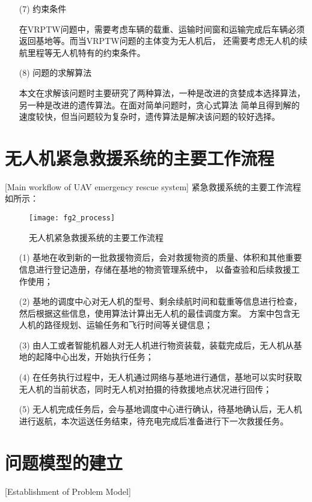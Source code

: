 \begin{itemize}
	\item[(7)]
	约束条件
	

	\qquad 在VRPTW问题中，需要考虑车辆的载重、运输时间窗和运输完成后车辆必须返回基地等。而当VRPTW问题的主体变为无人机后，
	还需要考虑无人机的续航里程等无人机特有的约束条件。

	\item[(8)]
	问题的求解算法


	\qquad 本文在求解该问题时主要研究了两种算法，一种是改进的贪婪成本选择算法，另一种是改进的遗传算法。在面对简单问题时，贪心式算法
	简单且得到解的速度较快，但当问题较为复杂时，遗传算法是解决该问题的较好选择。
\end{itemize}

\section{无人机紧急救援系统的主要工作流程}[Main workflow of UAV emergency rescue system]
紧急救援系统的主要工作流程如所示：

\begin{figure}[ht]
	\centering
	\texttt{[image: fg2\_process]}
	\caption{无人机紧急救援系统的主要工作流程}
	\label{fg202}
\end{figure}

\begin{itemize}
	\item [(1)]基地在收到新的一批救援物资后，会对救援物资的质量、体积和其他重要信息进行登记造册，存储在基地的物资管理系统中，
	以备查验和后续救援工作使用； 
	\item [(2)]基地的调度中心对无人机的型号、剩余续航时间和载重等信息进行检查，然后根据这些信息，使用算法计算出无人机的最佳调度方案。
	方案中包含无人机的路径规划、运输任务和飞行时间等关键信息；
	\item [(3)]由人工或者智能机器人对无人机进行物资装载，装载完成后，无人机从基地的起降中心出发，开始执行任务；
	\item [(4)]在任务执行过程中，无人机通过网络与基地进行通信，基地可以实时获取无人机的当前状态，同时无人机对拍摄的待救援地点状况进行回传；
	\item [(5)]无人机完成任务后，会与基地调度中心进行确认，待基地确认后，无人机进行返航，本次运送任务结束，待充电完成后准备进行下一次救援任务。
\end{itemize}

\section{问题模型的建立}[Establishment of Problem Model]

